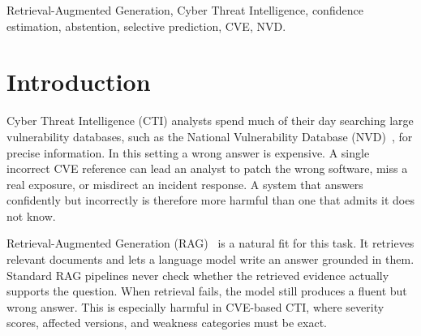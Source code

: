 \documentclass[conference]{IEEEtran}
\begin{document}
\begin{abstract}
Retrieval-Augmented Generation (RAG) grounds language models in external
knowledge, which makes it a natural tool for Cyber Threat Intelligence
(CTI). Standard RAG, however, answers every question, even when the
retrieved evidence does not support an answer, and can mislead an analyst
with invented vulnerability details. We study a confidence-aware RAG
pipeline for CVE search that declines to answer when a retrieval-stage
confidence score falls below a threshold. The score combines the
similarity of the best-matching record with its margin over the second
record, and needs no access to the language model's internals. On 200
automatically generated keyword queries over the 2023 National
Vulnerability Database (30{,}932 CVE records), the gate abstains on 16\%
of queries and raises precision on answered queries to 75.6\%, against
70.0\% for BM25-only RAG and 73.7\% for the same hybrid pipeline without
the gate. The rejected queries are genuinely hard: the ungated system
answers only 31.3\% of them correctly. Raising the threshold trades
coverage for precision, up to 85.0\% at 20\% coverage. We also show that
the score ranks answers by reliability (AUROC 0.70) but is not a
calibrated probability, and we explain why Expected Calibration Error
favours the ungated baseline.
\end{abstract}

\begin{IEEEkeywords}
Retrieval-Augmented Generation, Cyber Threat Intelligence, confidence
estimation, abstention, selective prediction, CVE, NVD.
\end{IEEEkeywords}

\section{Introduction}
Cyber Threat Intelligence (CTI) analysts spend much of their day searching
large vulnerability databases, such as the National Vulnerability Database
(NVD)~\cite{ref_wagner}, for precise information. In this setting a wrong
answer is expensive. A single incorrect CVE reference can lead an analyst
to patch the wrong software, miss a real exposure, or misdirect an
incident response. A system that answers confidently but incorrectly is
therefore more harmful than one that admits it does not know.

Retrieval-Augmented Generation (RAG)~\cite{ref_lewis} is a natural fit for
this task. It retrieves relevant documents and lets a language model write
an answer grounded in them. Standard RAG pipelines never check whether the
retrieved evidence actually supports the question. When retrieval fails,
the model still produces a fluent but wrong answer. This is especially
harmful in CVE-based CTI, where severity scores, affected versions, and
weakness categories must be exact.
\end{document}
